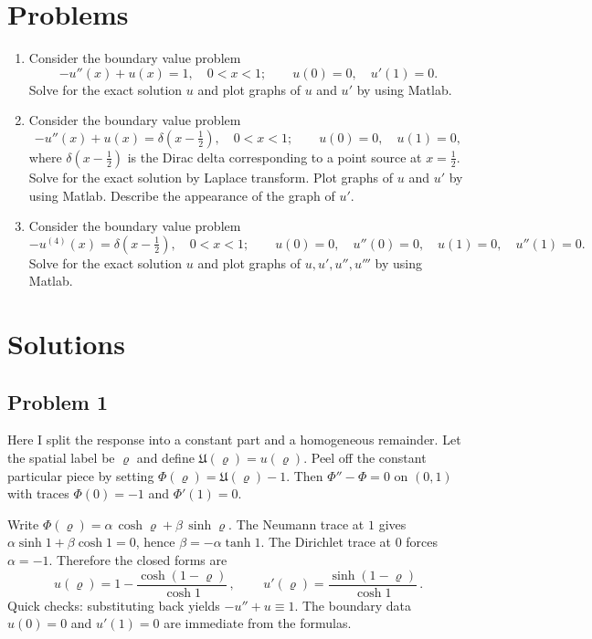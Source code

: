 \documentclass[12pt, a4paper]{article}
\begin{document}
\newpage
\section*{Problems}

\begin{enumerate}[leftmargin=1.2em,label=\arabic*.]
  \item Consider the boundary value problem
  \[
    -u''(x) + u(x) = 1,\quad 0<x<1;\qquad u(0)=0,\quad u'(1)=0.
  \]
  Solve for the exact solution \(u\) and plot graphs of \(u\) and \(u'\) by using Matlab.

  \item Consider the boundary value problem
  \[
    -u''(x) + u(x) = \delta\!\left(x-\tfrac{1}{2}\right),\quad 0<x<1;\qquad
    u(0)=0,\quad u(1)=0,
  \]
  where \(\delta(x-\tfrac{1}{2})\) is the Dirac delta corresponding to a point source at \(x=\tfrac{1}{2}\).
  Solve for the exact solution by Laplace transform. Plot graphs of \(u\) and \(u'\) by using Matlab. Describe the appearance of the graph of \(u'\).

  \item Consider the boundary value problem
  \[
    -u^{(4)}(x)=\delta\!\left(x-\tfrac{1}{2}\right),\quad 0<x<1;\qquad
    u(0)=0,\quad u''(0)=0,\quad u(1)=0,\quad u''(1)=0.
  \]
  Solve for the exact solution \(u\) and plot graphs of \(u,u',u'',u'''\) by using Matlab.
\end{enumerate}

\newpage
\section*{Solutions}

\subsection*{Problem 1}

Here I split the response into a constant part and a homogeneous remainder. Let the spatial label be \(\varrho\) and define \(\mathfrak{U}(\varrho)=u(\varrho)\). Peel off the constant particular piece by setting \(\Phi(\varrho)=\mathfrak{U}(\varrho)-1\). Then \(\Phi''-\Phi=0\) on \((0,1)\) with traces \(\Phi(0)=-1\) and \(\Phi'(1)=0\).

Write \(\Phi(\varrho)=\alpha\,\cosh\varrho+\beta\,\sinh\varrho\). The Neumann trace at \(1\) gives \(\alpha\sinh 1+\beta\cosh 1=0\), hence \(\beta=-\alpha\tanh 1\). The Dirichlet trace at \(0\) forces \(\alpha=-1\). Therefore the closed forms are
\[
\boxed{\,u(\varrho)=1-\frac{\cosh(1-\varrho)}{\cosh 1}\,},\qquad
\boxed{\,u'(\varrho)=\frac{\sinh(1-\varrho)}{\cosh 1}\,}.
\]
Quick checks: substituting back yields \(-u''+u\equiv 1\). The boundary data \(u(0)=0\) and \(u'(1)=0\) are immediate from the formulas.
\end{document}
